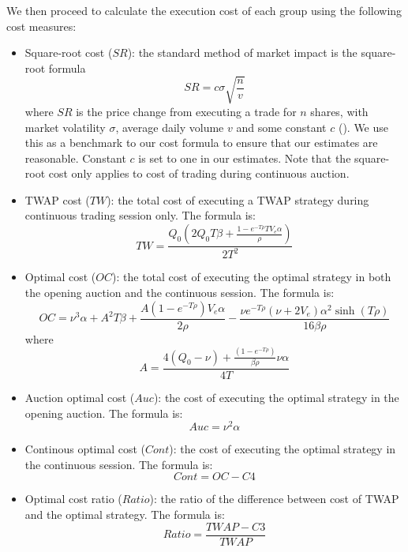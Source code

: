 We then proceed to calculate the execution cost of each group using the following cost measures:
\begin{itemize}
  \item Square-root cost ($SR$): the standard method of market impact is the square-root formula
        \[
          SR = c \sigma \sqrt{\frac{n}{v}}
        \]
        where $SR$ is the price change from executing a trade for $n$ shares, with market volatility $\sigma$, average daily volume $v$ and some constant $c$ (\cite{Toth2011}). We use this as a benchmark to our cost formula to ensure that our estimates are reasonable. Constant $c$ is set to one in our estimates. Note that the square-root cost only applies to cost of trading during continuous auction.
  \item TWAP cost ($TW$): the total cost of executing a TWAP strategy during continuous trading session only. The formula is:
        \[
          TW = \frac{Q_0 (2 Q_0 T \beta + \frac{1-e^{-T \rho} T V_e \alpha}{\rho})}{2 T^2}
        \]
  \item Optimal cost ($OC$): the total cost of executing the optimal strategy in both the opening auction and the continuous session. The formula is:
        \[
          OC = \nu^3 \alpha + A^2 T \beta + \frac{A (1-e^{-T \rho}) V_e \alpha}{2 \rho} - \frac{\nu e^{-T \rho} (\nu + 2 V_e) \alpha^2 \sinh(T \rho)}{16 \beta \rho}
        \]
        where
        \[
          A =   \frac{4 (Q_0 - \nu) + \frac{(1 - e^{-T \rho})}{\beta \rho} \nu \alpha} {4 T}
        \]
  \item Auction optimal cost ($Auc$): the cost of executing the optimal strategy in the opening auction. The formula is:
        \[
          Auc = \nu^2 \alpha
        \]
  \item Continous optimal cost ($Cont$): the cost of executing the optimal strategy in the continuous session. The formula is:
        \[
          Cont = OC - C4
        \]
  \item Optimal cost ratio ($Ratio$): the ratio of the difference between cost of TWAP and the optimal strategy. The formula is:
        \[
          Ratio = \frac{TWAP - C3}{TWAP}
        \]
\end{itemize}

